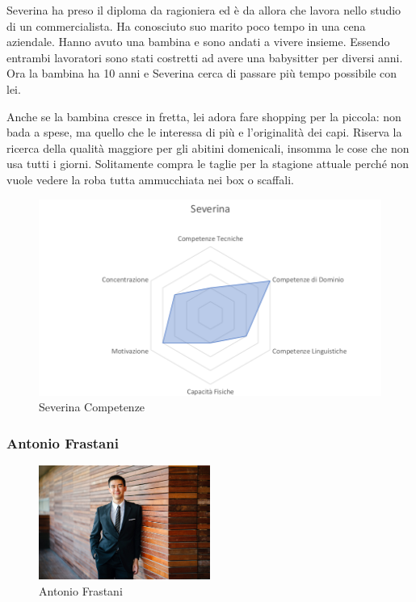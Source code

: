 \documentclass[12pt,italian,]{report}
\begin{document}
Severina ha preso il diploma da ragioniera ed è da allora che lavora
nello studio di un commercialista. Ha conosciuto suo marito poco tempo
in una cena aziendale. Hanno avuto una bambina e sono andati a vivere
insieme. Essendo entrambi lavoratori sono stati costretti ad avere una
babysitter per diversi anni. Ora la bambina ha 10 anni e Severina cerca
di passare più tempo possibile con lei.

Anche se la bambina cresce in fretta, lei adora fare shopping per la
piccola: non bada a spese, ma quello che le interessa di più e
l'originalità dei capi. Riserva la ricerca della qualità maggiore per
gli abitini domenicali, insomma le cose che non usa tutti i giorni.
Solitamente compra le taglie per la stagione attuale perché non vuole
vedere la roba tutta ammucchiata nei box o scaffali.

\begin{figure}[h]
\centering
\includegraphics{img/severina_competenze.png}
\caption{Severina Competenze}
\end{figure}

\hypertarget{antonio-frastani-1}{%
\subsubsection{Antonio Frastani}\label{antonio-frastani-1}}

\begin{figure}[h]
\centering
\includegraphics[width=0.5\textwidth,height=\textheight]{img/antonio.jpeg}
\caption{Antonio Frastani}
\end{figure}
\end{document}
